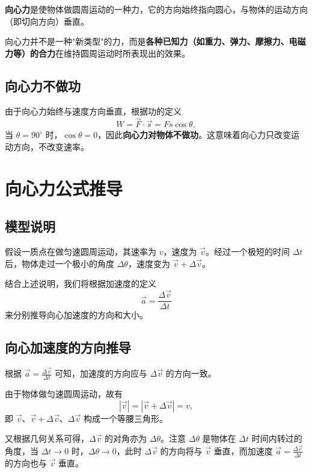 \documentclass[12pt,a4paper]{article}
\begin{document}
\textbf{向心力}是使物体做圆周运动的一种力，它的方向始终指向圆心，与物体的运动方向（即切向方向）垂直。

\begin{center}
\end{center}

向心力并不是一种"新类型"的力，而是\textbf{各种已知力（如重力、弹力、摩擦力、电磁力等）的合力}在维持圆周运动时所表现出的效果。

\subsection{向心力不做功}

由于向心力始终与速度方向垂直，根据功的定义
\[
W = \vec{F}\cdot\vec{s} = Fs\cos\theta,
\]
当 $\theta=90^\circ$ 时，$\cos\theta=0$，因此\textbf{向心力对物体不做功}。这意味着向心力只改变运动方向，不改变速率。

\section{向心力公式推导}

\subsection{模型说明}

假设一质点在做匀速圆周运动，其速率为 $v$，速度为 $\vec{v}$。经过一个极短的时间 $\Delta t$ 后，物体走过一个极小的角度 $\Delta\theta$，速度变为 $\vec{v}+\Delta\vec{v}$。

结合上述说明，我们将根据加速度的定义
\[
\vec{a}=\frac{\Delta\vec{v}}{\Delta t}
\]
来分别推导向心加速度的方向和大小。

\subsection{向心加速度的方向推导}

根据 $\vec{a}=\frac{\Delta\vec{v}}{\Delta t}$ 可知，加速度的方向应与 $\Delta\vec{v}$ 的方向一致。

由于物体做匀速圆周运动，故有
\[
|\vec{v}| = |\vec{v}+\Delta\vec{v}| = v,
\]
即 $\vec{v}$、$\vec{v}+\Delta\vec{v}$、$\Delta\vec{v}$ 构成一个等腰三角形。

又根据几何关系可得，$\Delta\vec{v}$ 的对角亦为 $\Delta\theta$。注意 $\Delta\theta$ 是物体在 $\Delta t$ 时间内转过的角度，当 $\Delta t\to 0$ 时，$\Delta\theta\to 0$，此时 $\Delta\vec{v}$ 的方向将与 $\vec{v}$ 垂直，而加速度 $\vec{a}=\frac{\Delta\vec{v}}{\Delta t}$ 的方向也与 $\vec{v}$ 垂直。
\end{document}
